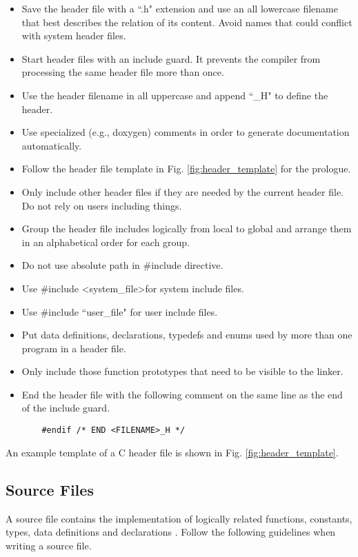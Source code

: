 \documentclass[11pt]{article}
\begin{document}
\begin{itemize}
	\item Save the header file with a ``.h" extension and use an all lowercase filename that best describes the relation of its content. Avoid names that could conflict with system header files.
	\item Start header files with an include guard. It prevents the compiler from processing the same header file more than once.
	\item Use the header filename in all uppercase and append ``\_H" to define the header.
	\item Use specialized (e.g., doxygen) comments in order to generate documentation automatically.
	\item Follow the header file template in Fig. \ref{fig:header_template} for the prologue.
	\item Only include other header files if they are needed by the current header file. Do not rely on users including things.
	\item Group the header file includes logically from local to global and arrange them in an alphabetical order for each group.
	\item Do not use absolute path in \#include directive.
	\item Use \#include \textless system\_file\textgreater for system include files.
	\item Use \#include ``user\_file" for user include files.
	\item Put data definitions, declarations, typedefs and enums used by more than one program in a header file.
	\item Only include those function prototypes that need to be visible to the linker.
	\item End the header file with the following comment on the same line as the end of the include guard.
	
	\begin{Verbatim}
	#endif /* END <FILENAME>_H */
	\end{Verbatim}
	
\end{itemize}

An example template of a C header file is shown in Fig. \ref{fig:header_template}.


\subsection{Source Files}
A source file contains the implementation of logically related functions, constants, types, data definitions and declarations \cite{nasa_style1994}. Follow the following guidelines when writing a source file.
\end{document}
